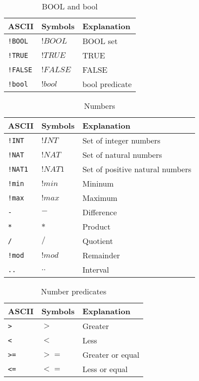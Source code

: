 \begin{table}[!htbp]
  \centering
  \begin{tabular}{|l|l|l|}
    \hline
    ASCII & Symbols & Explanation \\
    \hline
    \verb|!BOOL| & $!BOOL$ & BOOL set \\
    \verb$!TRUE$ & $!TRUE$ & TRUE \\
    \verb|!FALSE| & $!FALSE$ & FALSE \\
    \verb|!bool| & $!bool$ & bool predicate \\
    \hline
  \end{tabular}
  \caption{BOOL and bool}
\end{table}
 
\begin{table}[!htbp]
  \centering
  \begin{tabular}{|l|l|l|}
    \hline
    ASCII & Symbols & Explanation \\
    \hline
    \verb|!INT| & $!INT$ & Set of integer numbers \\
    \verb|!NAT| & $!NAT$ & Set of natural numbers \\
    \verb|!NAT1| & $!NAT1$ & Set of positive natural numbers \\
    \verb|!min| & $!min$ & Mininum \\
    \verb|!max| & $!max$ & Maximum \\
    \verb|-| & $-$ & Difference \\
    \verb|*| & $*$ & Product \\
    \verb|/| & $/$ & Quotient \\
    \verb|!mod| & $!mod$ & Remainder \\
    \verb|..| & $..$ & Interval  \\
    \hline
  \end{tabular}
  \caption{Numbers}
\end{table}

\begin{table}[!htbp]
  \centering
  \begin{tabular}{|l|l|l|}
    \hline
    ASCII & Symbols & Explanation \\
    \hline
    \verb|>| & $>$ & Greater \\
    \verb|<| & $<$ & Less \\
    \verb|>=| & $>=$ & Greater or equal \\
    \verb|<=| & $<=$ & Less or equal \\
    \hline
  \end{tabular}
  \caption{Number predicates}
\end{table}

